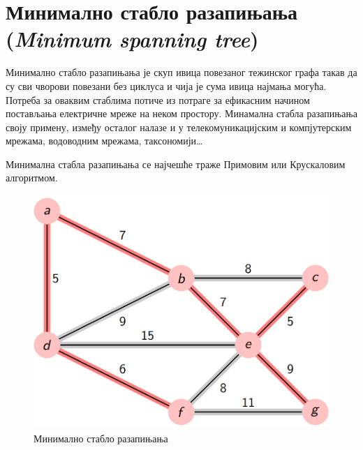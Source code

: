 \documentclass[11pt, oneside, a4paper]{article}
\begin{document}
\section{Минимално стабло разапињања \\
(\textit{Minimum spanning tree})}
Минимално стабло разапињања је скуп ивица повезаног тежинског графа такав да су сви чворови повезани без циклуса и чија је сума ивица најмања могућа. Потреба за оваквим стаблима потиче из потраге за ефикасним начином постављања електричне мреже на неком простору. Минамална стабла разапињања своју примену, између осталог налазе и у телекомуникацијским и компјутерским мрежама, водоводним мрежама, таксономији\ldots \par
Минимална стабла разапињања се најчешће траже Примовим или Крускаловим алгоритмом.
\begin{figure}[ht]
    \centering
    \includegraphics[scale=0.5]{primn.png}
    \caption{Минимално стабло разапињања}
    \label{fig:my_label}
\end{figure}
\newpage
\end{document}
